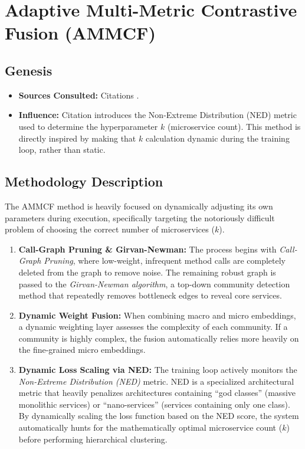 \documentclass[12pt, a4paper]{article}
\begin{document}
\clearpage
\section{Adaptive Multi-Metric Contrastive Fusion (AMMCF)}

\subsection{Genesis}
\begin{itemize}
    \item \textbf{Sources Consulted:} Citations \cite{jin2021, kalia2020, chaieb2024, weerasinghe2026}.
    \item \textbf{Influence:} Citation \cite{chaieb2024} introduces the Non-Extreme Distribution (NED) metric used to determine the hyperparameter $k$ (microservice count). This method is directly inspired by making that $k$ calculation dynamic during the training loop, rather than static.
\end{itemize}

\subsection{Methodology Description}
The AMMCF method is heavily focused on dynamically adjusting its own parameters during execution, specifically targeting the notoriously difficult problem of choosing the correct number of microservices ($k$).
\begin{enumerate}
    \item \textbf{Call-Graph Pruning \& Girvan-Newman:} The process begins with \textit{Call-Graph Pruning}, where low-weight, infrequent method calls are completely deleted from the graph to remove noise. The remaining robust graph is passed to the \textit{Girvan-Newman algorithm}, a top-down community detection method that repeatedly removes bottleneck edges to reveal core services.
    \item \textbf{Dynamic Weight Fusion:} When combining macro and micro embeddings, a dynamic weighting layer assesses the complexity of each community. If a community is highly complex, the fusion automatically relies more heavily on the fine-grained micro embeddings.
    \item \textbf{Dynamic Loss Scaling via NED:} The training loop actively monitors the \textit{Non-Extreme Distribution (NED)} metric. NED is a specialized architectural metric that heavily penalizes architectures containing ``god classes'' (massive monolithic services) or ``nano-services'' (services containing only one class). By dynamically scaling the loss function based on the NED score, the system automatically hunts for the mathematically optimal microservice count ($k$) before performing hierarchical clustering.
\end{enumerate}
\end{document}
